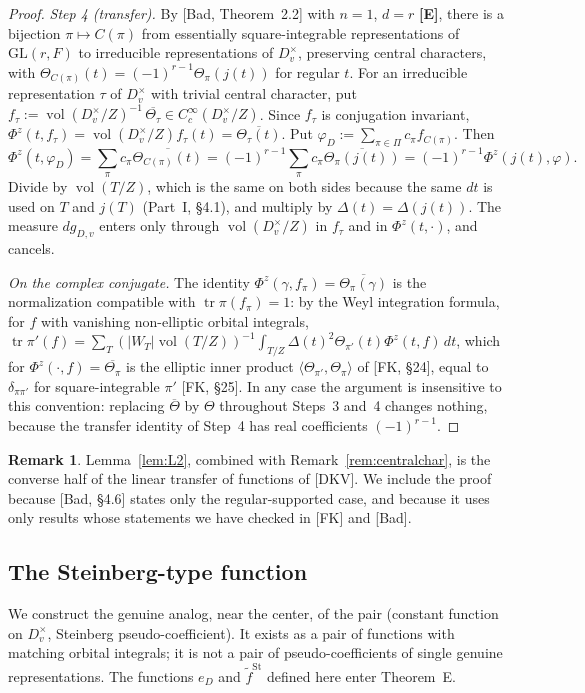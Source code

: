 \documentclass[12pt]{article}
\newcommand{\ov}[1]{\overline{#1}}
\newcommand{\tr}{\operatorname{tr}}
\newcommand{\vol}{\operatorname{vol}}
\newcommand{\GL}{\mathrm{GL}}
\newcommand{\St}{\mathrm{St}}
\newcommand{\Ev}{\textbf{[E]}}
\theoremstyle{plain}
\theoremstyle{definition}
\newtheorem{remark}[theorem]{Remark}
\begin{document}
\begin{proof}
\emph{Step 4 (transfer).} By [Bad, Theorem~2.2] with $n=1$, $d=r$ \Ev, there is a bijection $\pi\mapsto C(\pi)$ from essentially square-integrable representations of $\GL(r,F)$ to irreducible representations of $D_v^\times$, preserving central characters, with $\Theta_{C(\pi)}(t)=(-1)^{r-1}\Theta_\pi(j(t))$ for regular $t$. For an irreducible representation $\tau$ of $D_v^\times$ with trivial central character, put $f_\tau:=\vol(D_v^\times/Z)^{-1}\,\ov{\Theta_\tau}\in C_c^\infty(D_v^\times/Z)$. Since $f_\tau$ is conjugation invariant, $\Phi^z(t,f_\tau)=\vol(D_v^\times/Z)f_\tau(t)=\ov{\Theta_\tau(t)}$. Put $\varphi_D:=\sum_{\pi\in\Pi}c_\pi f_{C(\pi)}$. Then
\[ \Phi^z(t,\varphi_D)=\sum_\pi c_\pi\ov{\Theta_{C(\pi)}(t)}=(-1)^{r-1}\sum_\pi c_\pi\ov{\Theta_\pi(j(t))}=(-1)^{r-1}\Phi^z(j(t),\varphi). \]
Divide by $\vol(T/Z)$, which is the same on both sides because the same $dt$ is used on $T$ and $j(T)$ (Part~I, \S4.1), and multiply by $\Delta(t)=\Delta(j(t))$. The measure $dg_{D,v}$ enters only through $\vol(D_v^\times/Z)$ in $f_\tau$ and in $\Phi^z(t,\cdot)$, and cancels.

\emph{On the complex conjugate.} The identity $\Phi^z(\gamma,f_\pi)=\ov{\Theta_\pi(\gamma)}$ is the normalization compatible with $\tr\pi(f_\pi)=1$: by the Weyl integration formula, for $f$ with vanishing non-elliptic orbital integrals, $\tr\pi'(f)=\sum_T(|W_T|\vol(T/Z))^{-1}\int_{T/Z}\Delta(t)^2\Theta_{\pi'}(t)\Phi^z(t,f)\,dt$, which for $\Phi^z(\cdot,f)=\ov{\Theta_\pi}$ is the elliptic inner product $\langle\Theta_{\pi'},\Theta_\pi\rangle$ of [FK, \S24], equal to $\delta_{\pi\pi'}$ for square-integrable $\pi'$ [FK, \S25]. In any case the argument is insensitive to this convention: replacing $\ov{\Theta}$ by $\Theta$ throughout Steps~3 and~4 changes nothing, because the transfer identity of Step~4 has real coefficients $(-1)^{r-1}$.
\end{proof}

\begin{remark}
Lemma~\ref{lem:L2}, combined with Remark~\ref{rem:centralchar}, is the converse half of the linear transfer of functions of [DKV]. We include the proof because [Bad, \S4.6] states only the regular-supported case, and because it uses only results whose statements we have checked in [FK] and [Bad].
\end{remark}


\subsection{The Steinberg-type function}\label{subsec:steinberg}
We construct the genuine analog, near the center, of the pair (constant function on $D_v^\times$, Steinberg pseudo-coefficient). It exists as a pair of functions with matching orbital integrals; it is not a pair of pseudo-coefficients of single genuine representations. The functions $e_D$ and $\tilde f^{\St}$ defined here enter Theorem~E.
\end{document}
